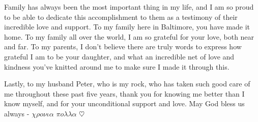 \documentclass[12pt]{report}
\begin{document}
Family has always been the most important thing in my life, and I am so proud to be able to dedicate this accomplishment to them as a testimony of their incredible love and support. To my family here in Baltimore, you have made it home. To my family all over the world, I am so grateful for your love, both near and far. To my parents, I don't believe there are truly words to express how grateful I am to be your daughter, and what an incredible net of love and kindness you've knitted around me to make sure I made it through this. 

Lastly, to my husband Peter, who is my rock, who has taken such good care of me throughout these past five years, thank you for knowing me better than I know myself, and for your unconditional support and love. May God bless us always - $\chi\rho o\nu\iota\alpha$ $\pi o\lambda\lambda\alpha$ $\heartsuit$
%
%

\pagestyle{plain}
\tableofcontents
\listoftables
\listoffigures

\cleardoublepage %


%
%





 







\end{document}

